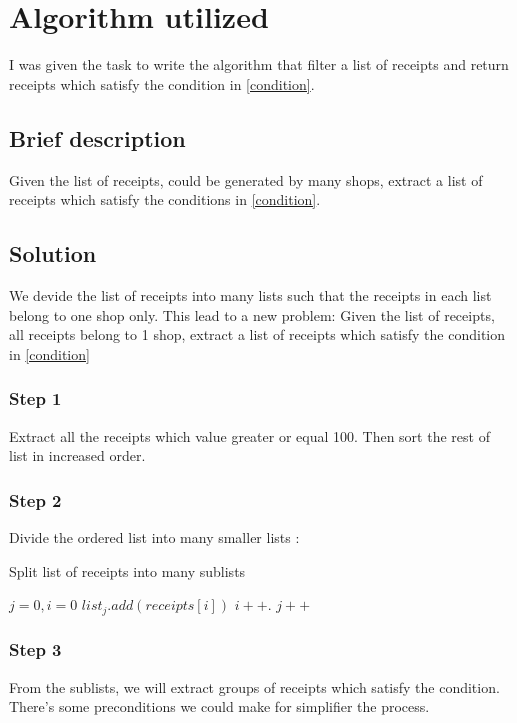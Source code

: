 \section{Algorithm utilized}

I was given the task to write the algorithm that filter a list of receipts and return receipts which satisfy the condition in  \ref{condition}. 

\subsection{Brief description}
Given the list of receipts, could be generated by many shops, extract a list of receipts which satisfy the conditions in \ref{condition}.

\subsection{Solution}
We devide the list of receipts into many lists such that the receipts in each list belong to one shop only. This lead to a new problem: 
Given the list of receipts, all receipts belong to 1 shop, extract a list of receipts which satisfy the condition in \ref{condition}

\subsubsection{Step 1}
Extract all the receipts which value greater or equal 100. Then sort the rest of list in increased order.

\subsubsection{Step 2}
Divide the ordered list into many smaller lists :

\begin{algorithm}[H]
\caption{Split list of receipts into many sublists}
\begin{algorithmic}
\State $j = 0, i = 0$
	\State $list_{j}.add(\textit{receipts}[i])$
	\State $i++$.
\Else
	\State $j++$
\EndIf
\EndWhile
\EndFunction
\end{algorithmic}
\end{algorithm}

\subsubsection{Step 3}
From the sublists, we will extract groups of receipts which satisfy the condition. There's some preconditions we could make for simplifier the process.

